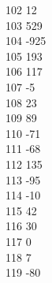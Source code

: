 { 102	12 \\
 103	529 \\
 104	-925 \\
 105	193 \\
 106	117 \\
 107	-5 \\
 108	23 \\
 109	89 \\
 110	-71 \\
 111	-68 \\
 112	135 \\
 113	-95 \\
 114	-10 \\
 115	42 \\
 116	30 \\
 117	0 \\
 118	7 \\
 119	-80 \\
}
